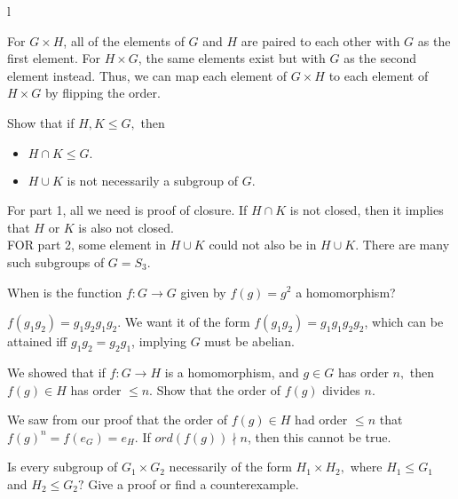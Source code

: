 l\documentclass{scrartcl}
\begin{document}
\begin{soln}
	For $G \times H$, all of the elements of $G$ and $H$ are paired to each other with $G$ as the first element. For $H \times G$, the same elements exist but with $G$ as the second element instead. Thus, we can map each element of $G \times H$ to each element of $H \times G$ by flipping the order.
\end{soln}

\begin{problem}[3]
    Show that if $H, K \le G,$ then
    \begin{itemize}
        \item $H \cap K \le G.$ 
        \item $H \cup K$ is not necessarily a subgroup of $G.$
    \end{itemize}
\end{problem}

\begin{soln}
    For part 1, all we need is proof of closure. If $H \cap K$ is not closed, then it implies that $H$ or $K$ is also not closed. \\
    FOR part 2, some element in $H \cup K$ could not also be in $H \cup K$. There are many such subgroups of $G = S_3$.
\end{soln}

\begin{problem}[4]
    When is the function $f : G \to G$ given by $f(g) = g^2$ a homomorphism?
\end{problem}

\begin{soln}
    $f(g_1g_2) = g_1g_2g_1g_2$. We want it of the form $f(g_1g_2) = g_1g_1g_2g_2$, which can be attained iff $g_1g_2 = g_2g_1$, implying $G$ must be abelian.
\end{soln}

\begin{problem}[5]
    We showed that if $f : G \to H$ is a homomorphism, and $g \in G$ has order $n,$ then $f(g) \in H$ has order $\le n.$ Show that the order of $f(g)$ divides $n.$
\end{problem}

\begin{soln}
    We saw from our proof that the order of $f(g) \in H$ had order $\le n$ that $f(g)^n = f(e_G) = e_H$. If $ord(f(g)) \nmid n$, then this cannot be true.
\end{soln}

\begin{problem}[6]
    Is every subgroup of $G_1 \times G_2$ necessarily of the form $H_1 \times H_2,$ where $H_1 \leq G_1$ and $H_2 \le G_2?$ Give a proof or find a counterexample.
\end{problem}
\end{document}
